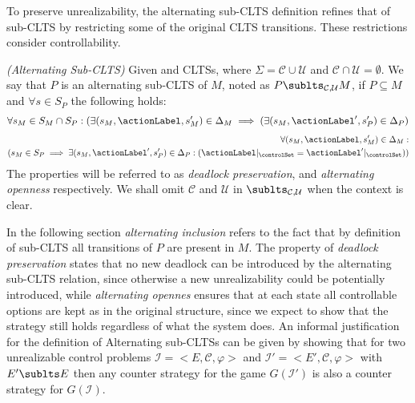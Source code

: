 To preserve unrealizability, the alternating sub-CLTS definition refines that of sub-CLTS by restricting some of the original CLTS transitions. 
These restrictions consider controllability. 
\newpage
\begin{definition}\label{def:alternating_sub_clts}\emph{(Alternating Sub-CLTS)}
	Given  and
	 CLTSs, 
	where $\Sigma =\mathcal{C}\cup \mathcal{U}$ and $\mathcal{C}\cap
	\mathcal{U}=\emptyset$. We say that $P$ is an alternating
	sub-CLTS of $M$, noted as $P \sublts_{\mathcal{C},\mathcal{U}} M$, if  $P \subseteq M$  and $\forall s \in S_{P}$ the following holds:
	\footnotesize
		\begin{align}
\begin{aligned}
\forall s_{M} \in S_{M}\cap S_{P}:(\exists (s_M,\actionLabel,s'_M) \in \Delta_M \implies (\exists (s_M,\actionLabel',s'_P) \in \Delta_P)
\end{aligned}
\end{align}	
\begin{align}
\begin{aligned}
\forall (s_M,\actionLabel,s'_M) \in \Delta_M:\\ 
(s_M \in S_P \implies\exists (s_M,\actionLabel',s'_P) \in \Delta_P:(\actionLabel|_{\controlSet} = \actionLabel'|_{\controlSet}))
\end{aligned}
\end{align}	
	\normalsize
	The properties will be referred to as \emph{deadlock preservation}, and \emph{alternating openness} respectively. We shall omit $\mathcal{C}$ and $\mathcal{U}$ in $\sublts_{\mathcal{C},\mathcal{U}}$ when the context is clear. 
\end{definition}
 
In the following section \emph{alternating inclusion} refers to the fact that by definition of sub-CLTS all transitions of $P$ are present in $M$.
The property of \emph{deadlock preservation} states that no new deadlock can be introduced by the alternating sub-CLTS relation, since otherwise a new unrealizability could be potentially introduced, while \emph{alternating opennes} ensures that at each state all controllable options are kept as in the original structure, since we expect to show that the strategy still holds regardless of what the system does.
An informal justification for the definition of Alternating sub-CLTSs can be given by showing that for two unrealizable control problems $\mathcal{I} = <E, \mathcal{C}, \varphi>$ and $\mathcal{I'} = <E', \mathcal{C}, \varphi>$ with $E' \sublts E$ then any counter strategy for the game $G(\mathcal{I'})$ is also a counter strategy for $G(\mathcal{I})$. 

